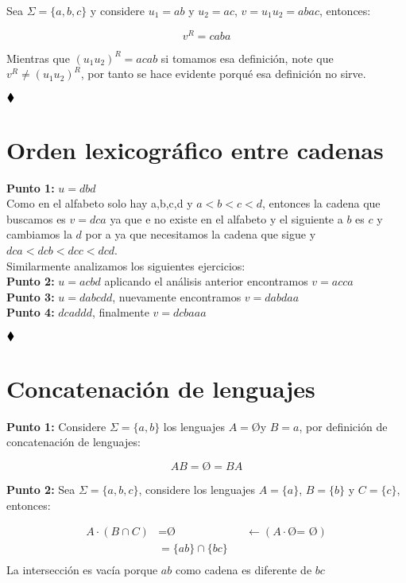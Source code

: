 Sea $\Sigma=\{a,b,c\}$ y considere $u_1=ab$ y $u_2=ac$, $v=u_1u_2=abac$, entonces:

$$v^R=caba$$

Mientras que $(u_1u_2)^R=acab$ si tomamos esa definición, note que $v^R\neq (u_1u_2)^R$, por tanto se hace evidente porqué esa definición no sirve.

$\hfill \blacklozenge$

\section{Orden lexicográfico entre cadenas}

\textbf{Punto 1:} $u=d b d$\\

Como en el alfabeto solo hay a,b,c,d y $a<b<c<d$, entonces la cadena que buscamos es $v=dca$ ya que e no existe en el alfabeto y el siguiente a $b$ es $c$ y cambiamos la $d$ por a ya que necesitamos la cadena que sigue y $dca<dcb<dcc<dcd$.\\

Similarmente analizamos los siguientes ejercicios:\\

\textbf{Punto 2:} $u=acbd$ aplicando el análisis anterior encontramos $v=acca$\\

\textbf{Punto 3:} $u=dabcdd$, nuevamente encontramos $v=dabdaa$\\

\textbf{Punto 4:} $dcaddd$, finalmente $v=dcbaaa$

$\hfill \blacklozenge$

\section{Concatenación de lenguajes} 

\textbf{Punto 1:} Considere $\displaystyle\Sigma=\{a,b\}$ los lenguajes $A=$\O \text{ }y $B={a}$, por definición de concatenación de lenguajes:

$$AB=\text{\O}=BA$$

\textbf{Punto 2:} Sea $\displaystyle\Sigma=\{a,b,c\}$, considere los lenguajes $A=\{a\}$, $B=\{b\}$ y $C=\{c\}$, entonces:

\begin{align*}
    A\cdot(B\cap C)&=\text{\O}  &&\longleftarrow(A\cdot \text{\O = \O})\\
    &=\{ab\}\cap\{bc\}\\
\end{align*}
La intersección es vacía porque $ab$ como cadena es diferente de $bc$\\

